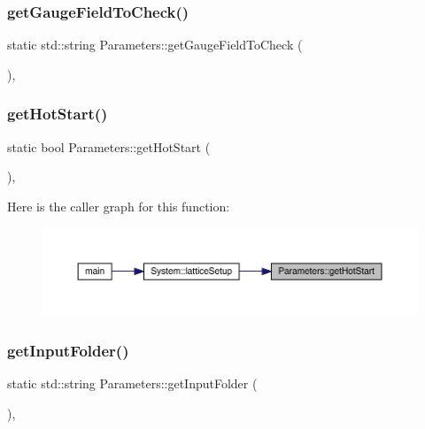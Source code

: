 \subsubsection{\texorpdfstring{getGaugeFieldToCheck()}{getGaugeFieldToCheck()}}
{\footnotesize\ttfamily static std\+::string Parameters\+::get\+Gauge\+Field\+To\+Check (\begin{DoxyParamCaption}{ }\end{DoxyParamCaption})\hspace{0.3cm}{\ttfamily [inline]}, {\ttfamily [static]}}

\mbox{\label{class_parameters_a5ba21c056f0b7da17abcdd0a1eb2061f}} 
\subsubsection{\texorpdfstring{getHotStart()}{getHotStart()}}
{\footnotesize\ttfamily static bool Parameters\+::get\+Hot\+Start (\begin{DoxyParamCaption}{ }\end{DoxyParamCaption})\hspace{0.3cm}{\ttfamily [inline]}, {\ttfamily [static]}}

Here is the caller graph for this function\+:\nopagebreak
\begin{figure}[H]
\begin{center}
\leavevmode
\includegraphics[width=350pt]{class_parameters_a5ba21c056f0b7da17abcdd0a1eb2061f_icgraph}
\end{center}
\end{figure}
\mbox{\label{class_parameters_aa593520a8f1c3282e399feb0cf70217b}} 
\subsubsection{\texorpdfstring{getInputFolder()}{getInputFolder()}}
{\footnotesize\ttfamily static std\+::string Parameters\+::get\+Input\+Folder (\begin{DoxyParamCaption}{ }\end{DoxyParamCaption})\hspace{0.3cm}{\ttfamily [inline]}, {\ttfamily [static]}}

